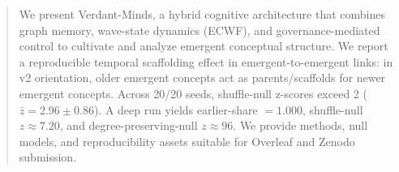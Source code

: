 \begin{abstract}
We present Verdant-Minds, a hybrid cognitive architecture that combines graph memory, wave-state dynamics (ECWF), and governance-mediated control to cultivate and analyze emergent conceptual structure. We report a reproducible temporal scaffolding effect in emergent-to-emergent links: in v2 orientation, older emergent concepts act as parents/scaffolds for newer emergent concepts. Across 20/20 seeds, shuffle-null z-scores exceed 2 ($\bar{z}=2.96\pm0.86$). A deep run yields earlier-share $=1.000$, shuffle-null $z\approx7.20$, and degree-preserving-null $z\approx96$. We provide methods, null models, and reproducibility assets suitable for Overleaf and Zenodo submission.
\end{abstract}
